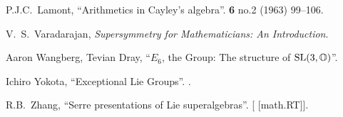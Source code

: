 \begin{thebibliography}{99}
P.J.C.~Lamont,
``Arithmetics in Cayley's algebra''.
 \textbf{6} no.2 (1963) 99--106.
{\tt{}}

V.~S.~Varadarajan,
\textit{Supersymmetry for Mathematicians: An Introduction}.

Aaron Wangberg, Tevian Dray,
``$E_{6}$, the Group: The structure of $\operatorname{SL}(3,\mathbb{O})$''.

Ichiro Yokota,
``Exceptional Lie Groups''.
.
  
R.B.~Zhang,
``Serre presentations of Lie superalgebras''.
[ [math.RT]].

\end{thebibliography}



